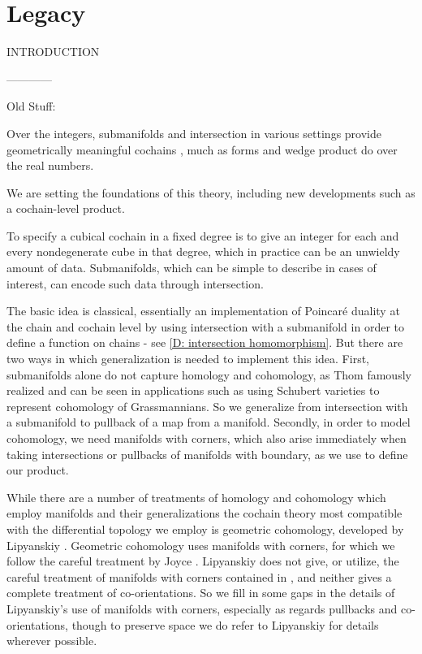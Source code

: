 
\section*{Legacy}

INTRODUCTION

------------

Old Stuff:


Over the integers, submanifolds and intersection in various settings provide geometrically meaningful cochains \cite{Lipy14, Joyc15},
much as forms and wedge product do over the real numbers.

We are setting the foundations of this theory, including new developments such as a cochain-level product.

To specify a cubical  cochain in a fixed degree is to give an integer for each and every {nondegenerate cube} in that degree,
which in practice can be an unwieldy amount of data.
Submanifolds, which can be simple to describe in cases of interest, can encode such data through intersection.

The basic idea is classical, essentially an implementation of Poincar\'e duality at the chain and cochain level by using intersection with a
submanifold in order to define a function on chains - see \cref{D: intersection homomorphism}.
But there are two ways in which  generalization is needed to implement this idea.
First, submanifolds alone do not capture homology and cohomology, as Thom famously realized and can be
seen in applications such as using Schubert varieties to represent cohomology of Grassmannians.
So we generalize from intersection with a submanifold to pullback of a map from a manifold.
Secondly, in order to model cohomology, we need manifolds with corners, which also arise immediately when taking intersections or pullbacks of manifolds with boundary, as we use to define our product.

While there are a number of treatments of homology and cohomology which employ manifolds and their
generalizations \cite{Whit47, BRS76,  FeSj83, Krec10,  Kahn01, Zing08, Joyc15} the cochain theory most compatible with the differential topology we employ is geometric cohomology, developed by Lipyanskiy \cite{Lipy14}.
Geometric cohomology uses manifolds with corners, for which we follow the careful treatment by Joyce \cite{Joy12}.
Lipyanskiy does not give, or utilize, the careful treatment of manifolds with corners contained in \cite{Joy12}, and neither gives a complete treatment of co-orientations.
So we fill in some gaps in the details of Lipyanskiy's use of manifolds with corners, especially as regards pullbacks and co-orientations, though to preserve space we do refer to Lipyanskiy for details wherever possible.

